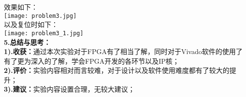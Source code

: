 \documentclass[12pt]{ctexart}
\begin{document}
效果如下：\\
\texttt{[image: problem3.jpg]}\\
以及复位时如下：\\
\texttt{[image: problem3\_1.jpg]}\\
{\bf5.总结与思考：}\\
{\bf1).收获：}通过本次实验对于FPGA有了相当了解，同时对于Vivado软件的使用了有了更为深入的了解，学会FPGA开发的各环节以及IP核；\\
{\bf2).评价：}实验内容相对而言较难，对于设计以及软件使用难度都有了较大的提升；\\
{\bf3).建议：}实验内容设置合理，无较大建议；
\end{document}
